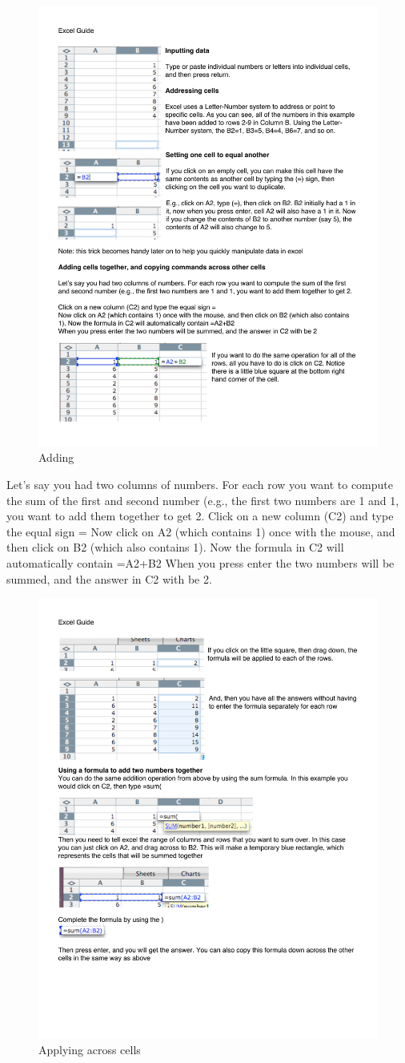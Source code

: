 \begin{figure}
      \includegraphics[width=.5\linewidth]{LabmanualFigures/Excel4.pdf}
      \caption{Adding}
      \label{fig:excel4}
\end{figure}

Let's say you had two columns of numbers. For each row you want to compute the sum of the first and second number (e.g., the first two numbers are 1 and 1, you want to add them together to get 2.
Click on a new column (C2) and type the equal sign =
Now click on A2 (which contains 1) once with the mouse, and then click on B2 (which also contains 1). Now the formula in C2 will automatically contain =A2+B2
When you press enter the two numbers will be summed, and the answer in C2 with be 2.

\begin{figure}
      \includegraphics[width=.5\linewidth]{LabmanualFigures/Excel5.pdf}
      \caption{Applying across cells}
      \label{fig:excel5}
\end{figure}

